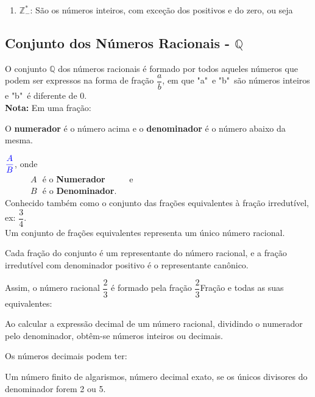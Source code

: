 \begin{multicols*}{2}
\begin{enumerate}
		\item $\mathbb{Z}^*_- $: São os números inteiros, com exceção dos positivos e do zero, ou seja 

	\end{enumerate}

	\subsection{Conjunto dos Números Racionais - $\mathbb{Q}$}

	O conjunto $\mathbb{Q} $ dos números racionais é formado por todos aqueles números que podem ser expressos na forma de fração $\dfrac{a}{b}$, em que "a"\ e "b"\ são números inteiros e "b"\ é diferente de 0.\\

	\textbf{\color{blue}Nota:} Em uma fração:

	O \textbf{\color{blue} numerador} é o número acima e o \textbf{\color{blue}denominador} é o número abaixo da mesma.

	$ \color{blue}\dfrac{A}{B} $, onde\\

	$\, \, \, \, \, \, \, \, \, \, \, \, \, \, \, \, \, \,A \, \, $ é o \textbf{\color{blue}Numerador} $\, \, \, \, \, \, \, \, \, \, \, \, \, $ e\\

	$\, \, \, \, \, \, \, \, \, \, \, \, \, \, \, \, \, \,B \, \, $ é o \textbf{\color{blue}Denominador}.\\

	Conhecido também como o conjunto das frações equivalentes à fração irredutível, ex: $\dfrac{3}{4}$.\\

	Um conjunto de frações equivalentes representa um único número racional.

	Cada fração do conjunto é um representante do número racional, e a fração irredutível com denominador positivo é o representante canônico.

	Assim, o número racional $\dfrac{2}{3} $ é formado pela fração $\dfrac{2}{3} $Fração e todas as suas equivalentes:

	Ao calcular a expressão decimal de um número racional, dividindo o numerador pelo denominador, obtêm-se números inteiros ou decimais.

	Os números decimais podem ter:

	Um número finito de algarismos, número decimal exato, se os únicos divisores do denominador forem 2 ou 5.


\end{multicols*}

